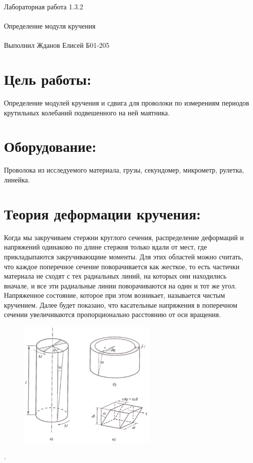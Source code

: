 \documentclass{astroedu-lab}
\begin{document}
\pagestyle{plain}

\begin{problem}{\huge Лабораторная работа 1.3.2\\\\Определение модуля кручения\\\\Выполнил Жданов Елисей Б01-205}

\section{Цель работы:}

Определение модулей кручения и сдвига для проволоки по измерениям периодов крутильных колебаний подвешенного на ней маятника.

\section{Оборудование:}

Проволока из исследуемого материала, грузы, секундомер, микрометр, рулетка, линейка.

\section{Теория деформации кручения:}

Когда мы закручиваем стержни круглого сечения, распределение деформаций и напряжений одинаково по длине стержня только вдали от мест, где прикладыпаются закручивающиие моменты. Для этих областей можно считать, что каждое поперечное сечение поворачивается как жесткое, то есть частички материала не сходят с тех радиальных линий, на которых они находились вначале, и все эти радиальные линии поворачиваются на один и тот же угол. Напряженное состояние, которое при этом возникает, называется чистым кручением. Далее будет показано, что касательные напряжения в поперечном сечении увеличиваются пропорционально расстоянию от оси вращения.

\newpage

\begin{figure}
\includegraphics[width=0.6\textwidth]{theory_1.png}
\caption{}
\label{ris:image}
\end{figure}.


\end{problem}
\end{document}
